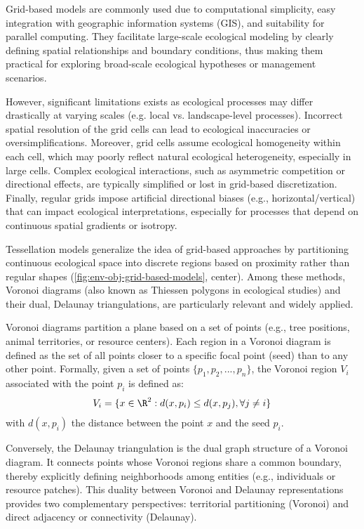 Grid-based models are commonly used due to computational simplicity, easy integration with geographic information systems (GIS), and suitability for parallel computing. They facilitate large-scale ecological modeling by clearly defining spatial relationships and boundary conditions, thus making them practical for exploring broad-scale ecological hypotheses or management scenarios.

However, significant limitations exists as ecological processes may differ drastically at varying scales (e.g. local vs. landscape-level processes). Incorrect spatial resolution of the grid cells can lead to ecological inaccuracies or oversimplifications. Moreover, grid cells assume ecological homogeneity within each cell, which may poorly reflect natural ecological heterogeneity, especially in large cells. Complex ecological interactions, such as asymmetric competition or directional effects, are typically simplified or lost in grid-based discretization. Finally, regular grids impose artificial directional biases (e.g., horizontal/vertical) that can impact ecological interpretations, especially for processes that depend on continuous spatial gradients or isotropy.

Tessellation models generalize the idea of grid-based approaches by partitioning continuous ecological space into discrete regions based on proximity rather than regular shapes (\cref{fig:env-obj-grid-based-models}, center). Among these methods, Voronoi diagrams (also known as Thiessen polygons in ecological studies) and their dual, Delaunay triangulations, are particularly relevant and widely applied.

Voronoi diagrams partition a plane based on a set of points (e.g., tree positions, animal territories, or resource centers). Each region in a Voronoi diagram is defined as the set of all points closer to a specific focal point (seed) than to any other point. Formally, given a set of points $\{p_1, p_2, ..., p_n\}$, the Voronoi region $V_i$ associated with the point $p_i$ is defined as:
\begin{align}
    V_i = \{ x \in \R^2 : d(x, p_i) \leq d(x, p_j), \forall j \neq i \}
\end{align}
with $d(x, p_i)$ the distance between the point $x$ and the seed $p_i$.

Conversely, the Delaunay triangulation is the dual graph structure of a Voronoi diagram. It connects points whose Voronoi regions share a common boundary, thereby explicitly defining neighborhoods among entities (e.g., individuals or resource patches). This duality between Voronoi and Delaunay representations provides two complementary perspectives: territorial partitioning (Voronoi) and direct adjacency or connectivity (Delaunay).

